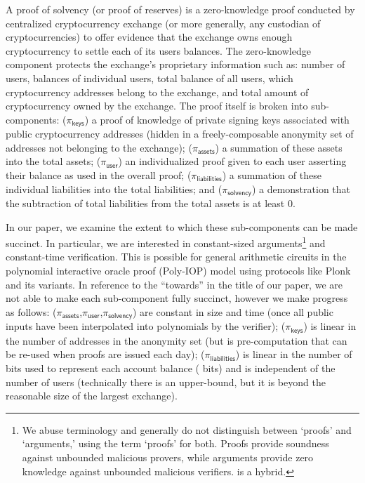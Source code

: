 A proof of solvency (or proof of reserves) is a zero-knowledge proof conducted by centralized cryptocurrency exchange (or more generally, any custodian of cryptocurrencies) to offer evidence that the exchange owns enough cryptocurrency to settle each of its users balances. The zero-knowledge component protects the exchange's proprietary information such as: number of users, balances of individual users, total balance of all users, which cryptocurrency addresses belong to the exchange, and total amount of cryptocurrency owned by the exchange. The proof itself is broken into sub-components: ($\pi_\mathsf{keys}$) a proof of knowledge of private signing keys associated with public cryptocurrency addresses (hidden in a freely-composable anonymity set of addresses not belonging to the exchange); ($\pi_\mathsf{assets}$) a summation of these assets into the total assets; ($\pi_\mathsf{user}$) an individualized proof given to each user asserting their balance as used in the overall proof; ($\pi_\mathsf{liabilities}$) a summation of these individual liabilities into the total liabilities; and ($\pi_\mathsf{solvency}$) a demonstration that the subtraction of total liabilities from the total assets is at least 0.

In our paper, we examine the extent to which these sub-components can be made succinct. In particular, we are interested in constant-sized arguments\footnote{We abuse terminology and generally do not distinguish between `proofs' and `arguments,' using the term `proofs' for both. Proofs provide soundness against unbounded malicious provers, while arguments provide zero knowledge against unbounded malicious verifiers. \Sys is a hybrid.} and constant-time verification. This is possible for general arithmetic circuits in the polynomial interactive oracle proof (Poly-IOP) model using protocols like Plonk and its variants. In reference to the ``towards'' in the title of our paper, we are not able to make each sub-component fully succinct, however we make progress as follows: ($\pi_\mathsf{assets}$,$\pi_\mathsf{user}$,$\pi_\mathsf{solvency}$) are constant in size and time (once all public inputs have been interpolated into polynomials by the verifier); ($\pi_\mathsf{keys}$) is linear in the number of addresses in the anonymity set (but is pre-computation that can be re-used when proofs are issued each day); ($\pi_\mathsf{liabilities}$) is linear in the number of bits used to represent each account balance ( bits) and is independent of the number of users (technically there is an upper-bound, but it is beyond the reasonable size of the largest exchange).

